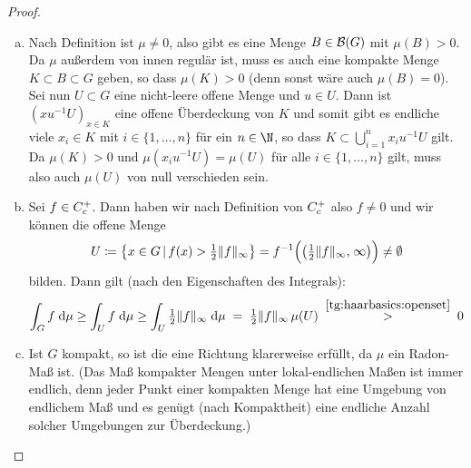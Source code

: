 \begin{proof}\hfill
    \begin{enumerate}[(a)]
        \item
            Nach Definition ist $\mu\neq0$, also gibt es eine Menge
            $B\in\mathcal{B}(G)$ mit $\mu(B)>0$. Da $\mu$ außerdem von innen
            regulär ist, muss es auch eine kompakte Menge $K\subset B\subset G$
            geben, so dass $\mu(K)>0$ (denn sonst wäre auch $\mu(B)=0$). Sei nun
            $U\subset G$ eine nicht-leere offene Menge und $u\in U$. Dann ist
            $(xu^{-1}U)_{x\in K}$ eine offene Überdeckung von $K$ und somit gibt
            es endliche viele $x_i\in K$ mit $i\in\{1,\ldots,n\}$ für ein
            $n\in\N$, so dass $K\subset \bigcup_{i=1}^n x_iu^{-1}U$ gilt. Da
            $\mu(K)>0$ und $\mu(x_iu^{-1}U) = \mu(U)$ für alle
            $i\in\{1,\ldots,n\}$ gilt, muss also auch $\mu(U)$ von null
            verschieden sein.
            
        \item
            Sei $f\in C_c^+$. Dann haben wir nach Definition von
            $C_c^+$ also $f\neq0$ und wir können die offene Menge
            \[ U\defeq \bigl\{ x\in G \Mid f(x) > \thalf\supnorm{f} \bigr\}
                = f^{-1}\Bigl( 
                        \bigl(\thalf\supnorm{f}, \mkern2mu\infty\bigr)
                    \Bigr) \neq \emptyset
            \]
            bilden. Dann gilt (nach den Eigenschaften des Integrals):
            \[ \int_G f \;\mathrm{d} \mu \geq \int_U f \;\mathrm{d} \mu \geq \int_U
                \tfrac{1}{2} \lVert f\rVert_\infty \;\mathrm{d} \mu \;=\; \tfrac{1}{2}\lVert f\rVert_\infty \, \mu(U) 
                \;\overset{\ref{tg:haarbasics:openset}}{>}\; 0
            \]
            
        \item
            Ist $G$ kompakt, so ist die eine Richtung klarerweise erfüllt, da $\mu$
            ein Radon-Maß ist. (Das Maß kompakter Mengen unter lokal-endlichen
            Maßen ist immer endlich, denn jeder Punkt einer kompakten Menge hat
            eine Umgebung von endlichem Maß und es genügt (nach Kompaktheit)
            eine endliche Anzahl solcher Umgebungen zur Überdeckung.)
            

\end{enumerate}
\end{proof}
